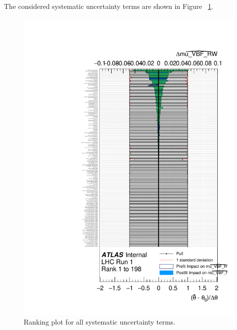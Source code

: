 The considered systematic uncertainty terms are shown in Figure ~\ref{fig:syst_ranking}. 

\begin{figure}[h]
  \centering
  \includegraphics[width=.9\textwidth]{figure/ranking.pdf}
  \caption{Ranking plot for all systematic uncertainty terms. }
  \label{fig:syst_ranking}
\end{figure}


